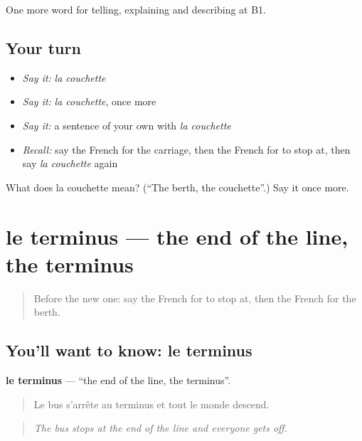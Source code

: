 \begin{grammarlens}[title={What you've built}]
One more word for telling, explaining and describing at B1.
\end{grammarlens}

\subsection*{Your turn}
\begin{itemize}
\raggedright
  \item \emph{Say it:} \emph{la couchette}
  \item \emph{Say it:} \emph{la couchette}, once more
  \item \emph{Say it:} a sentence of your own with \emph{la couchette}
  \item \emph{Recall:} say the French for the carriage, then the French for to stop at, then say \emph{la couchette} again
\end{itemize}

\begin{tcolorbox}[breakable,colback=teal!4,colframe=teal!35!black,title={Before you move on}]
What does la couchette mean? (\textquotedblleft{}The berth, the couchette\textquotedblright{}.) Say it once more.
\end{tcolorbox}
\section[le terminus]{le terminus — the end of the line, the terminus}

\label{lesson:FR-C414-terminus}



\begin{quote}
Before the new one: say the French for to stop at, then the French for the berth.
\end{quote}

\subsection*{You'll want to know: le terminus}
\textbf{le terminus} — \textquotedblleft{}the end of the line, the terminus\textquotedblright{}.

\begin{quote}
Le bus s'arrête au terminus et tout le monde descend.
\end{quote}

\begin{quote}
\emph{The bus stops at the end of the line and everyone gets off.}
\end{quote}

